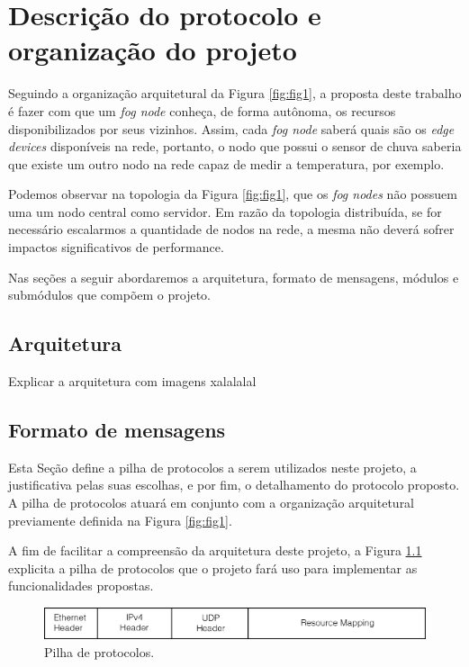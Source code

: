 \chapter{\label{chap:chap3} Descrição do protocolo e organização do projeto}

Seguindo a organização arquitetural da Figura \ref{fig:fig1}, a proposta deste trabalho é fazer com que um \textit{fog node} conheça, de forma autônoma, os recursos disponibilizados por seus vizinhos.
Assim, cada \textit{fog node} saberá quais são os \textit{edge devices} disponíveis na rede, portanto,
o nodo que possui o sensor de chuva saberia que existe um outro nodo na rede capaz de medir a temperatura, por exemplo.


Podemos observar na topologia da Figura \ref{fig:fig1}, que os \textit{fog nodes} não possuem uma um nodo central como servidor.
Em razão da topologia distribuída, se for necessário escalarmos a quantidade de nodos na rede, a mesma não deverá sofrer impactos significativos de performance.

Nas seções a seguir abordaremos a arquitetura, formato de mensagens, módulos e submódulos que compõem o projeto.

\section{Arquitetura}

Explicar a arquitetura com imagens xalalalal


\section{Formato de mensagens}

Esta Seção define a pilha de protocolos a serem utilizados neste projeto, a justificativa pelas suas escolhas, e por fim, o detalhamento do protocolo proposto.
A pilha de protocolos atuará em conjunto com a organização arquitetural previamente definida na Figura \ref{fig:fig1}.

A fim de facilitar a compreensão da arquitetura deste projeto, a Figura \ref{fig:fig2} explicita a pilha de protocolos que o projeto fará uso para implementar as funcionalidades propostas.

\begin{figure}[htb!]
    \centering\includegraphics[width=.8\textwidth]{fig2.png}
    \caption%
    {\label{fig:fig2} Pilha de protocolos.}
\end{figure}

